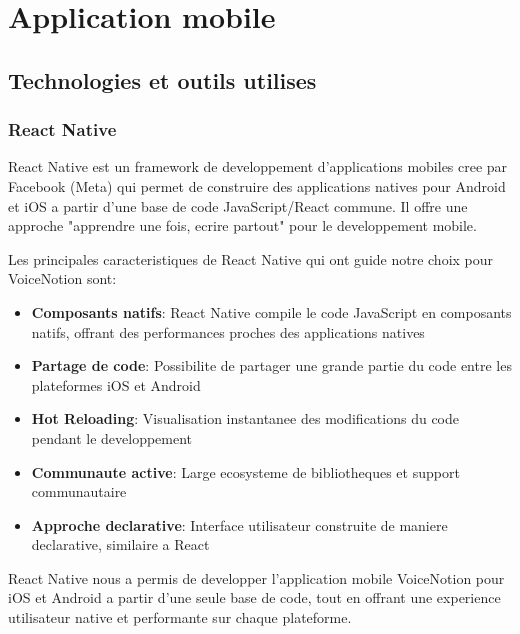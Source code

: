 \section{Application mobile}
\subsection{Technologies et outils utilises}

\subsubsection{React Native}
\begin{minipage}{0.7\textwidth}
React Native est un framework de developpement d'applications mobiles cree par Facebook (Meta) qui permet de construire des applications natives pour Android et iOS a partir d'une base de code JavaScript/React commune. Il offre une approche "apprendre une fois, ecrire partout" pour le developpement mobile.

Les principales caracteristiques de React Native qui ont guide notre choix pour VoiceNotion sont:

\begin{itemize}
    \item \textbf{Composants natifs}: React Native compile le code JavaScript en composants natifs, offrant des performances proches des applications natives
    \item \textbf{Partage de code}: Possibilite de partager une grande partie du code entre les plateformes iOS et Android
    \item \textbf{Hot Reloading}: Visualisation instantanee des modifications du code pendant le developpement
    \item \textbf{Communaute active}: Large ecosysteme de bibliotheques et support communautaire
    \item \textbf{Approche declarative}: Interface utilisateur construite de maniere declarative, similaire a React
\end{itemize}

React Native nous a permis de developper l'application mobile VoiceNotion pour iOS et Android a partir d'une seule base de code, tout en offrant une experience utilisateur native et performante sur chaque plateforme.
\end{minipage}%
\hfill

